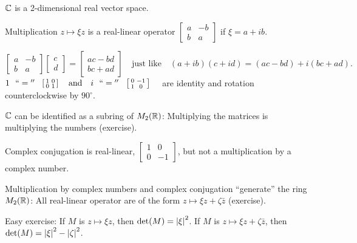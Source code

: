 \documentclass[10pt,aspectratio=169]{beamer}
\begin{document}
\begin{frame}
${\mathbb{C}}$ is a 2-dimensional real vector space.

\pause
\medskip

Multiplication $z \mapsto \xi z$ is a real-linear operator
\(
\left[
\begin{smallmatrix}
a & -b \\
b & a
\end{smallmatrix}
\right]
\) if $\xi = a+ib$.

\pause
\[
\begin{bmatrix}
a & -b \\
b & a
\end{bmatrix}
\begin{bmatrix}
c \\
d 
\end{bmatrix}
=
\begin{bmatrix}
ac-bd \\
bc+ad
\end{bmatrix}
\quad
\text{just like}
\quad
(a+ib)(c+id) = (ac-bd) + i(bc+ad) .
\]
\pause
\medskip
$
1 ~~ ``{}={}'' ~~
\left[
\begin{smallmatrix}
1 & 0 \\
0 & 1
\end{smallmatrix}
\right]
\quad \text{and} \quad
i ~~ ``{}={}'' ~~ \left[
\begin{smallmatrix}
0 & -1 \\
1 & 0
\end{smallmatrix} 
\right]
\quad
$
are identity and rotation counterclockwise by $90^{\circ}$.

\pause
\medskip

${\mathbb{C}}$ can be identified as a subring of $M_2({\mathbb{R}})$: Multiplying the matrices
is multiplying the numbers (exercise).

\medskip
\pause

Complex conjugation is real-linear,
$\left[ \begin{smallmatrix} 1 & 0 \\ 0 &
-1 \end{smallmatrix} \right]$,
but not a multiplication by a complex number.

\pause
\medskip

Multiplication by complex numbers and complex conjugation ``generate''
the ring $M_2({\mathbb{R}})$:  All real-linear operator are of the form
$z \mapsto \xi z + \zeta \bar{z}$ (exercise).

\pause
\medskip

Easy exercise:
If $M$ is $z \mapsto \xi z$, then $\det(M) = \left\lvert {\xi} \right\rvert^2$.
If $M$ is $z \mapsto \xi z+ \zeta \bar{z}$, then $\det(M) =
\left\lvert {\xi} \right\rvert^2-\left\lvert {\zeta} \right\rvert^2$.

\end{frame}
\end{document}
